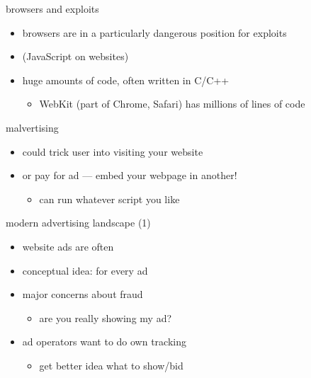 \begin{frame}{browsers and exploits}
    \begin{itemize}
    \item browsers are in a particularly dangerous position for exploits
    \item {} (JavaScript on websites)
    \item huge amounts of code, often written in C/C++
        \begin{itemize}
            \item WebKit (part of Chrome, Safari) has millions of lines of code
        \end{itemize}
    \end{itemize}
\end{frame}

\begin{frame}{malvertising}
    \begin{itemize}
    \item could trick user into visiting your website
        \vspace{.5cm}
    \item or pay for ad --- embed your webpage in another!
        \begin{itemize}
        \item can run whatever script you like
        \end{itemize}
    \end{itemize}
\end{frame}

\begin{frame}{modern advertising landscape (1)}
    \begin{itemize}
        \item website ads are often 
        \item conceptual idea:  for every ad
        \item major concerns about fraud
            \begin{itemize}
            \item are you really showing my ad?
            \end{itemize}
        \item ad operators want to do own tracking
            \begin{itemize}
            \item get better idea what to show/bid
            \end{itemize}
    \end{itemize}
\end{frame}

